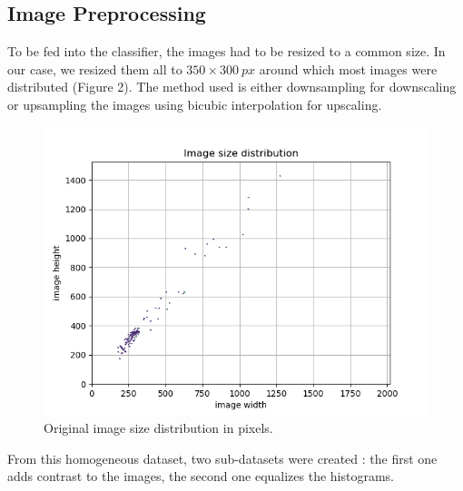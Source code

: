 \documentclass[conference]{IEEEtran}
\begin{document}
\subsection{Image Preprocessing}
To be fed into the classifier, the images had to be resized to a common size. In our case, we resized them all to $350\times300\: px$ around which most images were distributed (Figure 2). The method used is either downsampling for downscaling or upsampling the images using bicubic interpolation for upscaling.
\begin{figure}[h]
\centering
\includegraphics[scale=0.5]{figures/Image_size_distribution.png}
\caption{Original image size distribution in pixels.}
\end{figure}

From this homogeneous dataset, two sub-datasets were created : the first one adds contrast to the images, the second one equalizes the histograms.\\
\end{document}
